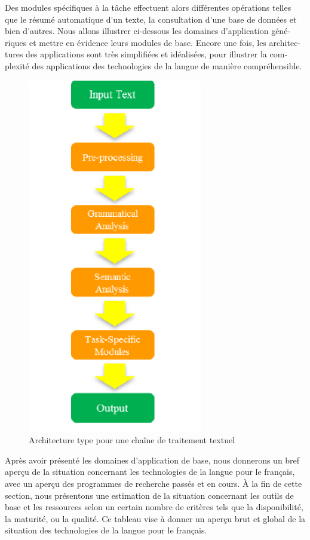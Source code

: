 \documentclass[]{../metanetpaper}
\begin{document}
\begin{french}
\begin{multicols}{2}
Des modules spécifiques à la tâche effectuent alors différentes
opérations telles que le résumé automatique d{\mbox '}un texte, la
consultation d{\mbox '}une base de données et bien d{\mbox '}autres. Nous allons
illustrer ci-dessous les domaines d{\mbox '}application génériques et mettre
en évidence leurs modules de base. Encore une fois, les architectures
des applications sont très simplifiées et idéalisées, pour illustrer
la complexité des applications des technologies de la langue de
manière compréhensible.

\begin{figure}[!ht]
\begin{center}
 \includegraphics[width=3.0in]{../_media/french/text_processing_app_architecture}
\caption{Architecture type pour une chaîne de traitement textuel}
\label{fig:textprocarchi}
\end{center}
\end{figure}

Après avoir présenté les domaines d{\mbox '}application de base, nous
donnerons un bref aperçu de la situation concernant les technologies
de la langue pour le français, avec un aperçu des programmes de
recherche passés et en cours. À la fin de cette section, nous
présentons une estimation de la situation concernant les outils de
base et les ressources selon un certain nombre de critères tels que la
disponibilité, la maturité, ou la qualité. Ce tableau vise à donner un
aperçu brut et global de la situation des technologies de la langue
pour le français.


\end{multicols}
\end{french}
\end{document}
